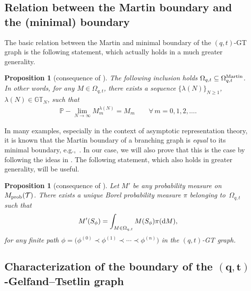 \documentclass[pdftex]{sigma}
\numberwithin{equation}{section}
\newtheorem{prop}[thm]{Proposition}
\newcommand{\GT}{\mathbb{GT}}
\newcommand{\Tau}{\mathcal{T}}
\newcommand{\Mart}{\Omega_{q, t}^{\rm Martin}}
\begin{document}
\subsection{Relation between the Martin boundary and the (minimal) boundary}


The basic relation between the Martin and minimal boundary of the $(q, t)$-GT graph is the following statement, which actually holds in a much greater generality.

\begin{prop}[{consequence of \cite[Theorem~6.1]{OO1}}]\label{thm:martinboundary}
The following inclusion holds $\Omega_{q, t} \subseteq \Mart$. In other words, for any $M\in\Omega_{q, t}$, there exists a sequence $\{\lambda(N)\}_{N\geq 1}$, $\lambda(N)\in\GT_N$, such that
\begin{gather*}
\mathbb{P}-\lim_{N\rightarrow\infty}{M^{\lambda(N)}_m} = M_m \qquad \forall \, m = 0, 1, 2, \dots.
\end{gather*}
\end{prop}

In many examples, especially in the context of asymptotic representation theory, it is known that the Martin boundary of a branching graph is \textit{equal} to its minimal boundary, e.g.,~\cite{G, OO1}. In our case, we will also prove that this is the case by following the ideas in \cite{G, Ol0}. The following statement, which also holds in greater generality, will be useful.

\begin{prop}[{consequence of \cite[Theorem~9.2]{OO1}}]\label{thm:simplexcons}
Let $M'$ be any probability measure on~$M_{\rm prob}(\Tau)$. There exists a unique Borel probability measure $\pi$ belonging to~$\Omega_{q, t}$ such that{\samepage
\begin{gather*}
M'(S_{\phi}) = \int_{M\in\Omega_{q, t}}{M(S_{\phi}) \pi({\rm d}M)},
\end{gather*}
for any finite path $\phi = \big(\phi^{(0)} \prec \phi^{(1)}\prec \cdots \prec \phi^{(n)}\big)$ in the $(q, t)$-GT graph.}
\end{prop}


\subsection[Characterization of the boundary of the $(q, t)$-Gelfand--Tsetlin graph]{Characterization of the boundary of the $\boldsymbol{(q, t)}$-Gelfand--Tsetlin graph}
\end{document}

